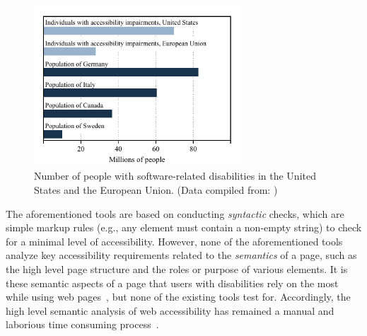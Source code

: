 \begin{figure}%
	\centering
	\includegraphics[width=0.70\columnwidth,height=6.0cm]{accessibility_testing/figures/population-plot}
	\caption{Number of people with software-related disabilities in the United States
		and the European Union. 
		(Data compiled from: \cite{stats:accessibility_population:US, stats:accessibility_population:EU})}
	\label{fig:population-plot}
\end{figure}

The aforementioned tools are based on conducting \emph{syntactic} checks, 
which are simple markup rules (e.g., any  element must contain a non-empty string) 
to check for a minimal level of accessibility. 
However, none of the aforementioned tools analyze key accessibility 
requirements related to the \emph{semantics} of a page, such as the high level page 
structure and the roles or purpose of various elements. 
It is these semantic aspects of a page that users with 
disabilities rely on the most while using web pages~\cite{2019users_survey}, but none 
of the existing tools test for. 
Accordingly, the high level semantic analysis of web accessibility has remained 
a manual and laborious time consuming process~\cite{bai2016evaluation,
acosta2018toward,brajnik2008comparative,abou2008web}.  
   
